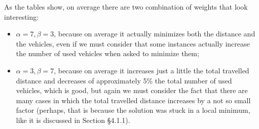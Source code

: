 As the tables show, on average there are two combination of weights that look interesting:
\begin{itemize}
    \item $\alpha=7,\beta=3$, because on average it actually minimizes both the distance and the vehicles, even if we must consider that some instances actually increase the number of used vehicles when asked to minimize them;
    \item $\alpha=3,\beta=7$, because on average it increases just a little the total travelled distance and decreases of approximately 5\% the total number of used vehicles, which is good, but again we must consider the fact that there are many cases in which the total travelled distance increases by a not so small factor (perhaps, that is because the solution was stuck in a local minimum, like it is discussed in Section §4.1.1).
\end{itemize}